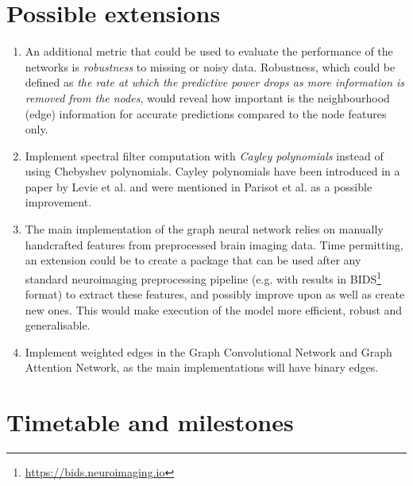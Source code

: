 \section*{Possible extensions}
\begin{enumerate}[label=PE\arabic*.]
  \item An additional metric that could be used to evaluate the performance of the networks is \textit{robustness} to missing or noisy data. Robustness, which could be defined as \textit{the rate at which the predictive power drops as more information is removed from the nodes}, would reveal how important is the neighbourhood (edge) information for accurate predictions compared to the node features only.
  \item Implement spectral filter computation with \textit{Cayley polynomials} instead of using Chebyshev polynomials. Cayley polynomials have been introduced in a paper by Levie et al. \cite{levie2017cayleynets} and were mentioned in Parisot et al. \cite{parisot2018disease} as a possible improvement.
  \item The main implementation of the graph neural network relies on manually handcrafted features from preprocessed brain imaging data. Time permitting, an extension could be to create a package that can be used after any standard neuroimaging preprocessing pipeline (e.g. with results in BIDS\footnote{\url{https://bids.neuroimaging.io}} format) to extract these features, and possibly improve upon as well as create new ones. This would make execution of the model more efficient, robust and generalisable.
  \item Implement weighted edges in the Graph Convolutional Network and Graph Attention Network, as the main implementations will have binary edges.

\end{enumerate}


\section*{Timetable and milestones}
\label{section:timetable}

